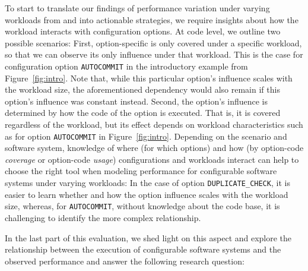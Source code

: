 To start to translate our findings of performance variation under varying workloads from  and  into actionable strategies, we require insights about how the workload interacts with configuration options. At code level, we outline two possible scenarios: First, option-specific is only covered under a specific workload, so that we can observe its only influence under that workload. This is the case for configuration option \texttt{AUTOCOMMIT} in the introductory example from Figure~\ref{fig:intro}. Note that, while this particular option's influence scales with the workload size, the aforementioned dependency would also remain if this option's influence was constant instead. Second, the option's influence is determined by how the code of the option is executed. That is, it is covered regardless of the workload, but its effect depends on workload characteristics such as for option \texttt{AUTOCOMMIT} in Figure~\ref{fig:intro}.
Depending on the scenario and software system, knowledge of where (for which options) and how (by option-code \textit{coverage} or option-code \textit{usage}) configurations and workloads interact can help to choose the right tool when modeling performance for configurable software systems under varying workloads: In the case of option \texttt{DUPLICATE\_CHECK}, it is easier to learn whether and how the option influence scales with the workload size, whereas, for \texttt{AUTOCOMMIT}, without knowledge about the code base, it is challenging to identify the more complex relationship.

In the last part of this evaluation, we shed light on this aspect and explore the relationship between the execution of configurable software systems and the observed performance and answer the following research question:

